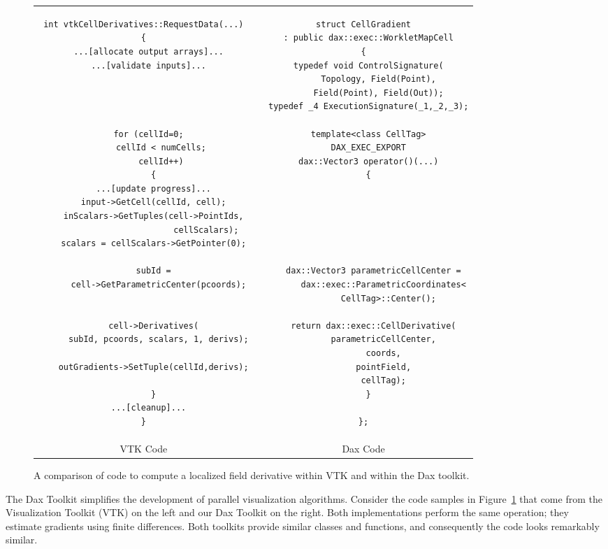 \begin{figure}
\centering
\begin{tabular}{cc}
\begin{lstlisting}
int vtkCellDerivatives::RequestData(...)
{
  ...[allocate output arrays]...
  ...[validate inputs]...




  for (cellId=0;
       cellId < numCells;
       cellId++)
    {
    ...[update progress]...
    input->GetCell(cellId, cell);
    inScalars->GetTuples(cell->PointIds,
                         cellScalars);
    scalars = cellScalars->GetPointer(0);

    subId =
      cell->GetParametricCenter(pcoords);


    cell->Derivatives(
      subId, pcoords, scalars, 1, derivs);
 
    outGradients->SetTuple(cellId,derivs);

    }
  ...[cleanup]...
}
\end{lstlisting}
&
\begin{lstlisting}
struct CellGradient
  : public dax::exec::WorkletMapCell
{
  typedef void ControlSignature(
      Topology, Field(Point),
      Field(Point), Field(Out));
  typedef _4 ExecutionSignature(_1,_2,_3);
 
  template<class CellTag>
  DAX_EXEC_EXPORT
  dax::Vector3 operator()(...)
  {






    dax::Vector3 parametricCellCenter =
        dax::exec::ParametricCoordinates<
          CellTag>::Center();
 
    return dax::exec::CellDerivative(
        parametricCellCenter,
        coords,
        pointField,
        cellTag);
  }
 
};
\end{lstlisting}
\\
VTK Code & Dax Code
\end{tabular}
\caption[Comparison of VTK code and Dax code.]{A comparison of code to
  compute a localized field derivative within VTK and within the Dax
  toolkit.}
\label{fig:CompareVTKDax}
\end{figure}

The Dax Toolkit simplifies the development of parallel visualization
algorithms. Consider the code samples in Figure~\ref{fig:CompareVTKDax}
that come from the Visualization Toolkit (VTK) on the left and our Dax
Toolkit on the right. Both implementations perform the same operation; they
estimate gradients using finite differences. Both toolkits provide similar
classes and functions, and consequently the code looks remarkably similar.

